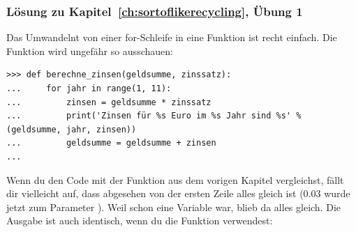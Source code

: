 \subsubsection{Lösung zu Kapitel~\ref{ch:sortoflikerecycling}, Übung 1}
Das Umwandelnt von einer for-Schleife in eine Funktion ist recht einfach. Die Funktion wird ungefähr so ausschauen:

\begin{Verbatim}[frame=single]
>>> def berechne_zinsen(geldsumme, zinssatz):
...     for jahr in range(1, 11):
...         zinsen = geldsumme * zinssatz
...         print('Zinsen für %s Euro im %s Jahr sind %s' % (geldsumme, jahr, zinsen))
...         geldsumme = geldsumme + zinsen
...
\end{Verbatim}

Wenn du den Code mit der Funktion aus dem vorigen Kapitel vergleichst, fällt dir vielleicht auf, dass abgesehen von der ersten Zeile alles gleich ist (0.03 wurde jetzt zum Parameter ). Weil  schon eine Variable war, blieb da alles gleich. Die Ausgabe ist auch identisch, wenn du die Funktion verwendest:

